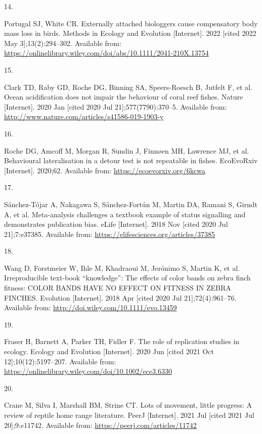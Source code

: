 \documentclass[10pt,a4paper]{article}
\newlength{\cslhangindent}
\newlength{\csllabelwidth}
\newlength{\cslentryspacingunit} %
\newenvironment{CSLReferences}[2] %
 {%
  \setlength{\parindent}{0pt}
  \ifodd #1
  \let\oldpar\par
  \def\par{\hangindent=\cslhangindent\oldpar}
  \fi
  \setlength{\parskip}{#2\cslentryspacingunit}
 }%
 {}
\newcommand{\CSLLeftMargin}[1]{\parbox[t]{\csllabelwidth}{#1}}
\newcommand{\CSLRightInline}[1]{\parbox[t]{\linewidth - \csllabelwidth}{#1}\break}
\begin{document}
\begin{CSLReferences}{0}{0}
\leavevmode\hypertarget{ref-portugal_externally_2022}{}%
\CSLLeftMargin{14. }
\CSLRightInline{Portugal SJ, White CR. Externally attached biologgers cause compensatory body mass loss in birds. Methods in Ecology and Evolution {[}Internet{]}. 2022 {[}cited 2022 May 3{]};13(2):294--302. Available from: \url{https://onlinelibrary.wiley.com/doi/abs/10.1111/2041-210X.13754}}

\leavevmode\hypertarget{ref-clark_ocean_2020}{}%
\CSLLeftMargin{15. }
\CSLRightInline{Clark TD, Raby GD, Roche DG, Binning SA, Speers-Roesch B, Jutfelt F, et al. Ocean acidification does not impair the behaviour of coral reef fishes. Nature {[}Internet{]}. 2020 Jan {[}cited 2020 Jul 21{]};577(7790):370--5. Available from: \url{http://www.nature.com/articles/s41586-019-1903-y}}

\leavevmode\hypertarget{ref-roche_behavioural_2020}{}%
\CSLLeftMargin{16. }
\CSLRightInline{Roche DG, Amcoff M, Morgan R, Sundin J, Finnøen MH, Lawrence MJ, et al. Behavioural lateralisation in a detour test is not repeatable in fishes. EcoEvoRxiv {[}Internet{]}. 2020;62. Available from: \url{https://ecoevorxiv.org/6kcwa}}

\leavevmode\hypertarget{ref-sanchez-tojar_meta-analysis_2018}{}%
\CSLLeftMargin{17. }
\CSLRightInline{Sánchez-Tójar A, Nakagawa S, Sánchez-Fortún M, Martin DA, Ramani S, Girndt A, et al. Meta-analysis challenges a textbook example of status signalling and demonstrates publication bias. eLife {[}Internet{]}. 2018 Nov {[}cited 2020 Jul 21{]};7:e37385. Available from: \url{https://elifesciences.org/articles/37385}}

\leavevmode\hypertarget{ref-wang_irreproducible_2018}{}%
\CSLLeftMargin{18. }
\CSLRightInline{Wang D, Forstmeier W, Ihle M, Khadraoui M, Jerónimo S, Martin K, et al. Irreproducible text-book {``knowledge''}: {The} effects of color bands on zebra finch fitness: {COLOR} {BANDS} {HAVE} {NO} {EFFECT} {ON} {FITNESS} {IN} {ZEBRA} {FINCHES}. Evolution {[}Internet{]}. 2018 Apr {[}cited 2020 Jul 21{]};72(4):961--76. Available from: \url{http://doi.wiley.com/10.1111/evo.13459}}

\leavevmode\hypertarget{ref-fraser_role_2020}{}%
\CSLLeftMargin{19. }
\CSLRightInline{Fraser H, Barnett A, Parker TH, Fidler F. The role of replication studies in ecology. Ecology and Evolution {[}Internet{]}. 2020 Jun {[}cited 2021 Oct 12{]};10(12):5197--207. Available from: \url{https://onlinelibrary.wiley.com/doi/10.1002/ece3.6330}}

\leavevmode\hypertarget{ref-crane_lots_2021}{}%
\CSLLeftMargin{20. }
\CSLRightInline{Crane M, Silva I, Marshall BM, Strine CT. Lots of movement, little progress: A review of reptile home range literature. PeerJ {[}Internet{]}. 2021 Jul {[}cited 2021 Jul 20{]};9:e11742. Available from: \url{https://peerj.com/articles/11742}}


\end{CSLReferences}
\end{document}
